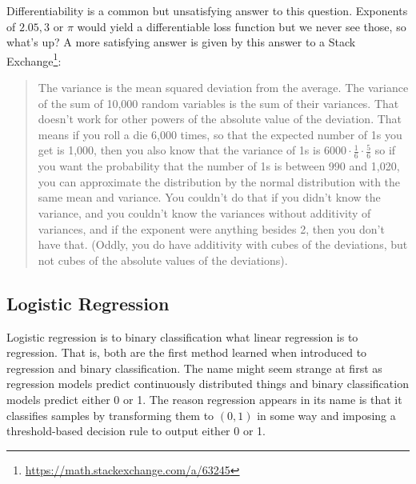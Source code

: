 \documentclass[11pt]{article}
\begin{document}
\begin{tcolorbox}[title={\centering\textbf{What makes MSE so special in general?}}, colback=myLightBlue, colbacktitle=myDarkBlue, colframe=myDarkBlue, coltitle=white]
    Differentiability is a common but unsatisfying answer to this question. Exponents of $2.05, 3$ or $\pi$ would yield a differentiable loss function but we never see those, so what's up? A more satisfying answer is given by this answer to a Stack Exchange\footnote{\url{https://math.stackexchange.com/a/63245}}:
    \begin{quote}
        The variance is the mean squared deviation from the average. The variance of the sum of 10,000 random variables is the sum of their variances. That doesn't work for other powers of the absolute value of the deviation. That means if you roll a die 6,000 times, so that the expected number of 1s you get is 1,000, then you also know that the variance of 1s is $6000\cdot\frac{1}{6}\cdot\frac{5}{6}$ so if you want the probability that the number of 1s is between 990 and 1,020, you can approximate the distribution by the normal distribution with the same mean and variance. You couldn't do that if you didn't know the variance, and you couldn't know the variances without additivity of variances, and if the exponent were anything besides 2, then you don't have that. (Oddly, you do have additivity with cubes of the deviations, but not cubes of the absolute values of the deviations).
    \end{quote}
\end{tcolorbox}

\subsection{Logistic Regression}

Logistic regression is to binary classification what linear regression is to regression. That is, both are the first method learned when introduced to regression and binary classification. The name might seem strange at first as regression models predict continuously distributed things and binary classification models predict either 0 or 1. The reason regression appears in its name is that it classifies samples by transforming them to $(0,1)$ in some way and imposing a threshold-based decision rule to output either 0 or 1.
\end{document}
